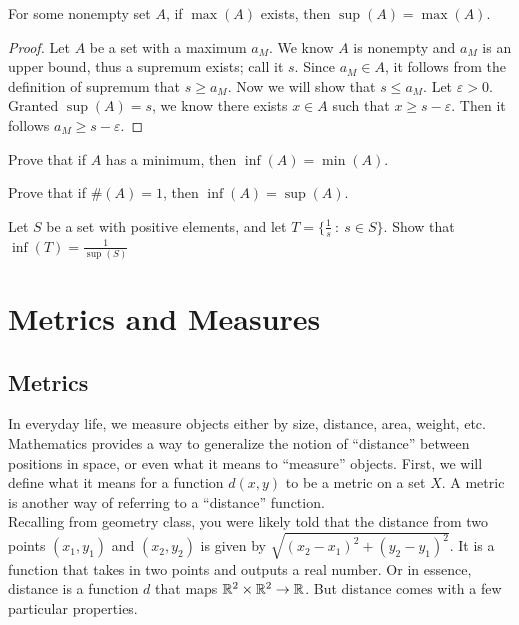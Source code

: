 \begin{theorem}
    For some nonempty set $A$, if $\max(A)$ exists, then $\sup(A)=\max(A)$. 
\end{theorem}
\begin{proof}
    Let $A$ be a set with a maximum $a_M$. We know $A$ is nonempty and $a_M$ is an upper bound, thus a supremum exists; call it $s$. Since $a_M\in A$, it follows from the definition of supremum that $s\geq a_M$. Now we will show that $s\leq a_M$. Let $\varepsilon >0$. Granted $\sup(A)=s$, we know there exists $x\in A$ such that $x\geq s-\varepsilon$. Then it follows $a_M \geq s-\varepsilon$.
\end{proof}

\begin{exercise}
    Prove that if $A$ has a minimum, then $\inf(A)=\min(A)$.
\end{exercise}

\begin{exercise}
    Prove that if $\#(A)=1$, then $\inf(A)=\sup(A)$.
\end{exercise}

\begin{exercise}
    Let $S$ be a set with positive elements, and let $T=\{\frac{1}{s}\ :\ s\in S\}$. Show that $\inf(T)=\frac{1}{\sup(S)}$ 
\end{exercise}


\section{Metrics and Measures}

\subsection{Metrics}


In everyday life, we measure objects either by size, distance, area, weight, etc. Mathematics provides a way to generalize the notion of ``distance'' between positions in space, or even what it means to ``measure'' objects. First, we will define what it means for a function $d(x,y)$ to be a metric on a set $X$. A metric is another way of referring to a ``distance'' function.\\

Recalling from geometry class, you were likely told that the distance from two points $(x_1,y_1)$ and $(x_2,y_2)$ is given by $\sqrt{(x_2-x_1)^2+(y_2-y_1)^2}$. It is a function that takes in two points and outputs a real number. Or in essence, distance is a function $d$ that maps $\mathbb{R}^2\times\mathbb{R}^2\to\mathbb{R}$. But distance comes with a few particular properties. \\


